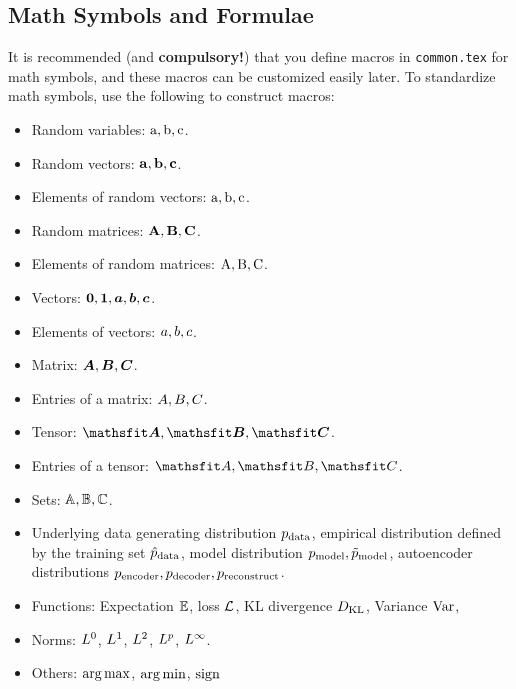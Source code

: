 \subsection{Math Symbols and Formulae}\label{sub:method:mathematics}

It is recommended (and \textbf{compulsory!})
that you define macros
in \verb|common.tex|
for math symbols,
and these macros
can be customized easily later.
To standardize math symbols,
use the following to construct macros:
\begin{itemize}

    \item Random variables:
    \( {\textnormal{a}}, {\textnormal{b}}, {\textnormal{c}} \).

    \item Random vectors:
    \( {\mathbf{a}}, {\mathbf{b}}, {\mathbf{c}} \).

    \item Elements of random vectors:
    \( {\textnormal{a}}, {\textnormal{b}}, {\textnormal{c}} \).

    \item Random matrices:
    \( {\mathbf{A}}, {\mathbf{B}}, {\mathbf{C}} \).

    \item Elements of random matrices:
    \( {\textnormal{A}}, {\textnormal{B}}, {\textnormal{C}} \).

    \item Vectors:
    \( {\bm{0}}, {\bm{1}}, {\bm{a}}, {\bm{b}}, {\bm{c}} \).

    \item Elements of vectors:
    \( {a}, {b}, {c} \).

    \item Matrix:
    \( {\bm{A}}, {\bm{B}}, {\bm{C}} \).

    \item Entries of a matrix:
    \( {A}, {B}, {C} \).

    \item Tensor:
    \( \tA, \tB, \tC \).

    \item Entries of a tensor:
    \( \etA, \etB, \etC \).

    \item Sets:
    \( {\mathbb{A}}, {\mathbb{B}}, {\mathbb{C}} \).

    \item Underlying data generating distribution
    \( p_{\rm{data}} \),
    empirical distribution defined by the training set
    \( \hat{p}_{\rm{data}} \),
    model distribution \( p_{\rm{model}}, \tilde{p}_{\rm{model}} \),
    autoencoder distributions \( p_{\rm{encoder}}, p_{\rm{decoder}}, p_{\rm{reconstruct}} \).

    \item Functions:
    Expectation \( \mathbb{E} \),
    loss \( \mathcal{L} \),
    KL divergence \( D_{\mathrm{KL}} \),
    Variance \( \mathrm{Var} \),
    \etc{}

    \item Norms:
    \( L^0 \), \( L^1 \), \( L^2 \),
    \( L^p \), \( L^\infty \).

    \item Others:
    \( \operatorname*{arg\,max} \), \( \operatorname*{arg\,min} \), \( \operatorname{sign} \)

\end{itemize}

